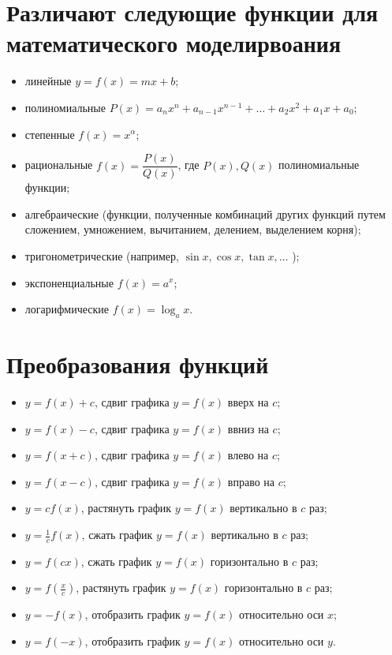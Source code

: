 \documentclass[a4paper,14pt]{report}
\begin{document}
\section*{Различают следующие функции для математического моделирвоания}
\begin{itemize}
	\item линейные $y = f(x) = mx + b$;
	\item полиномиальные $P(x) = a_n x^n + a_{n-1} x^{n-1} + \dots + a_2 x^2 + a_1 x + a_0$;
	\item степенные $f(x) = x^{\alpha}$;
	\item рациональные $f(x) = \dfrac{P(x)}{Q(x)}$, где $P(x),Q(x)$ полиномиальные функции;
	\item алгебраические (функции, полученные комбинаций других функций путем сложением, умножением, вычитанием, делением, выделением корня);
	\item тригонометрические (например, $\sin x , \cos x, \tan x, \dots$ );
	\item экспоненциальные $f(x) = a^x$;
	\item логарифмические $f(x) = \log_a x$.
\end{itemize}


\section*{ \colorbox{light-blue}{Преобразования функций}}
\begin{itemize}
	\item $y = f(x) + c$, сдвиг графика $y = f(x)$ вверх на $c$;
	\item $y = f(x) - c$, сдвиг графика $y = f(x)$ ввниз на $c$;
	\item $y = f(x + c)$, сдвиг графика $y = f(x)$ влево на $c$;
	\item $y = f(x - c)$, сдвиг графика $y = f(x)$ вправо на $c$;
	\item $y = c f(x)$, растянуть график $y = f(x)$ вертикально в $c$ раз;
	\item $y = \frac{1}{c} f(x)$, сжать график $y = f(x)$ вертикально в $c$ раз;
	\item $y = f(cx)$, сжать график $y = f(x)$ горизонтально в $c$ раз;
	\item $y = f(\frac{x}{c})$, растянуть график $y = f(x)$ горизонтально в $c$ раз;
	\item $y = -f(x)$, отобразить график $y = f(x)$ относительно оси $x$;
	\item $y = f(-x)$, отобразить график $y = f(x)$ относительно оси $y$.
\end{itemize}
\end{document}
